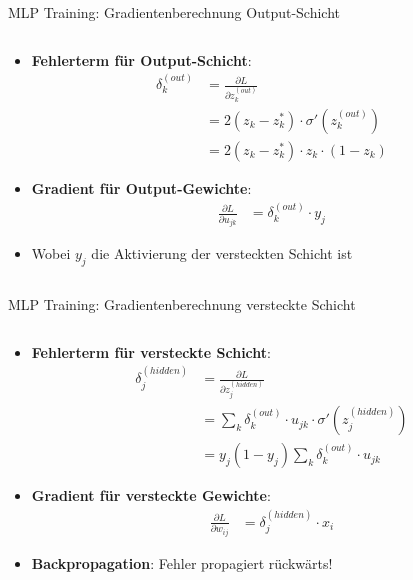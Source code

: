 \documentclass[aspectratio=1610, xcolor=dvipsnames, 9pt]{beamer}
\begin{document}
      \begin{frame}{MLP Training: Gradientenberechnung Output-Schicht}
        \begin{columns}
          \begin{column}{1\textwidth}
            \begin{itemize}
              \item \textbf{Fehlerterm für Output-Schicht}:
              \begin{align}
                \delta_k^{(out)} &= \frac{\partial L}{\partial z_k^{(out)}} \\
                &= 2(z_k - z_k^*) \cdot \sigma'(z_k^{(out)}) \\
                &= 2(z_k - z_k^*) \cdot z_k \cdot (1 - z_k)
              \end{align}
              \item \textbf{Gradient für Output-Gewichte}:
              \begin{align}
                \frac{\partial L}{\partial u_{jk}} &= \delta_k^{(out)} \cdot y_j
              \end{align}
              \item Wobei $y_j$ die Aktivierung der versteckten Schicht ist
            \end{itemize}
          \end{column}
        \end{columns}
      \end{frame}
      \begin{frame}{MLP Training: Gradientenberechnung versteckte Schicht}
        \begin{columns}
          \begin{column}{1\textwidth}
            \begin{itemize}
              \item \textbf{Fehlerterm für versteckte Schicht}:
              \begin{align}
                \delta_j^{(hidden)} &= \frac{\partial L}{\partial z_j^{(hidden)}} \\
                &= \sum_{k} \delta_k^{(out)} \cdot u_{jk} \cdot \sigma'(z_j^{(hidden)}) \\
                &= y_j (1-y_j) \sum_{k} \delta_k^{(out)} \cdot u_{jk}
              \end{align}
              \item \textbf{Gradient für versteckte Gewichte}:
              \begin{align}
                \frac{\partial L}{\partial w_{ij}} &= \delta_j^{(hidden)} \cdot x_i
              \end{align}
              \item \textbf{Backpropagation}: Fehler propagiert rückwärts!
            \end{itemize}
          \end{column}
        \end{columns}
      \end{frame}
\end{document}
